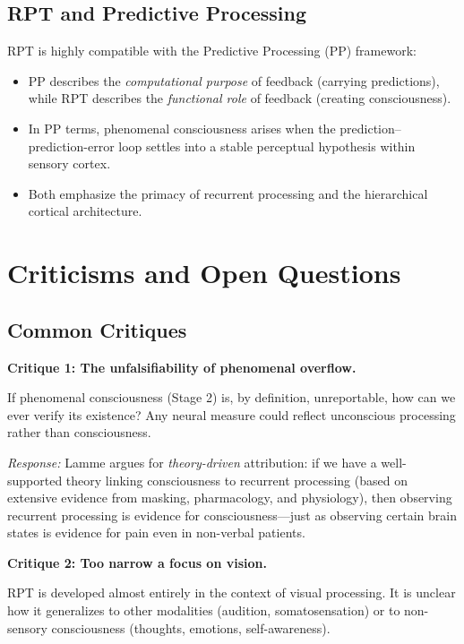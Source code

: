 \documentclass[11pt,a4paper]{report}
\begin{document}
\section{RPT and Predictive Processing}

RPT is highly compatible with the Predictive Processing (PP) framework:
\begin{itemize}[leftmargin=1.5em]
  \item PP describes the \emph{computational purpose} of feedback (carrying predictions), while RPT describes the \emph{functional role} of feedback (creating consciousness).
  \item In PP terms, phenomenal consciousness arises when the prediction--prediction-error loop settles into a stable perceptual hypothesis within sensory cortex.
  \item Both emphasize the primacy of recurrent processing and the hierarchical cortical architecture.
\end{itemize}


\chapter{Criticisms and Open Questions}

\section{Common Critiques}

\textbf{Critique 1: The unfalsifiability of phenomenal overflow.}

If phenomenal consciousness (Stage 2) is, by definition, unreportable, how can we ever verify its existence? Any neural measure could reflect unconscious processing rather than consciousness.

\emph{Response:} Lamme argues for \emph{theory-driven} attribution: if we have a well-supported theory linking consciousness to recurrent processing (based on extensive evidence from masking, pharmacology, and physiology), then observing recurrent processing is evidence for consciousness---just as observing certain brain states is evidence for pain even in non-verbal patients.

\textbf{Critique 2: Too narrow a focus on vision.}

RPT is developed almost entirely in the context of visual processing. It is unclear how it generalizes to other modalities (audition, somatosensation) or to non-sensory consciousness (thoughts, emotions, self-awareness).
\end{document}
